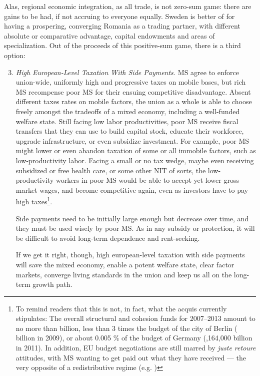 \documentclass[11pt,a4paper,oneside,openright]{article}
\begin{document}
Alas, regional economic integration, as all trade, is not zero-sum game: 
there are gains to be had, if not accruing to everyone equally. 
Sweden is better of for having a prospering, converging Romania as a trading partner, with different absolute or comparative advantage, capital endowments and areas of specialization. 
Out of the proceeds of this positive-sum game, there is a third option:
\begin{enumerate}
	\setcounter{enumi}{2}
	\item \emph{High European-Level Taxation With Side Payments.} \gls{MS} agree to enforce union-wide, uniformly high and progressive taxes on mobile bases, but rich \gls{MS} recompense poor \gls{MS} for their ensuing competitive disadvantage. 
	Absent different taxes rates on mobile factors, the union as a whole is able to choose freely amongst the tradeoffs of a mixed economy, including a well-funded welfare state. 
	Still facing low labor productivities, poor \gls{MS} receive fiscal transfers that they can use to build capital stock, educate their workforce, upgrade infrastructure, or even subsidize investment. 
	For example, poor \gls{MS} might lower or even abandon taxation of some or all immobile factors, such as low-productivity labor. 
	Facing a small or no tax wedge, maybe even receiving subsidized or free health care, or some other \gls{NIT} of sorts, the low-productivity workers in poor \gls{MS} would be able to accept yet lower gross market wages, and become competitive again, even as investors have to pay high taxes\footnote{
		To remind readers that this is not, in fact, what the acquis currently stipulates: 
		The overall structural and cohesion funds for 2007--2013 amount to no more than  billion, less than 3 times the budget of the city of Berlin ( billion in 2009), or about 0.005 \% of the budget of Germany (,164,000 billion in 2011). 
		In addition, \gls{EU} budget negotiations are still marred by \emph{juste retoure} attitudes, with \gls{MS} wanting to get paid out what they have received --- the very opposite of a redistributive regime (e.g. \citealt{Begg2008a})}.
	
	Side payments need to be initially large enough but decrease over time, and they must be used wisely by poor \gls{MS}. 
	As in any subsidy or  protection, it will be difficult to avoid long-term dependence and rent-seeking.
	
	If we get it right, though, high european-level taxation with side payments will save the mixed economy, enable a potent welfare state, clear factor markets, converge living standards in the union and keep us all on the long-term growth path. 
\end{enumerate}
\end{document}
